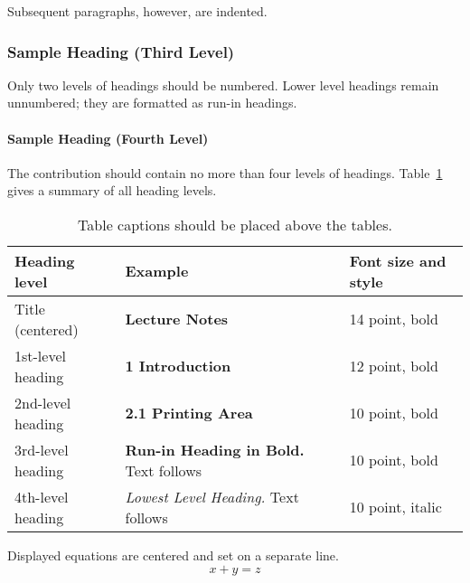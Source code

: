 \documentclass[runningheads]{llncs}
\begin{document}
Subsequent paragraphs, however, are indented.

\subsubsection{Sample Heading (Third Level)} Only two levels of
headings should be numbered. Lower level headings remain unnumbered;
they are formatted as run-in headings.

\paragraph{Sample Heading (Fourth Level)}
The contribution should contain no more than four levels of
headings. Table~\ref{tab1} gives a summary of all heading levels.

\begin{table}
\caption{Table captions should be placed above the
tables.}\label{tab1}
\begin{tabular}{|l|l|l|}
\hline
Heading level &  Example & Font size and style\\
\hline
Title (centered) &  {\Large\bfseries Lecture Notes} & 14 point, bold\\
1st-level heading &  {\large\bfseries 1 Introduction} & 12 point, bold\\
2nd-level heading & {\bfseries 2.1 Printing Area} & 10 point, bold\\
3rd-level heading & {\bfseries Run-in Heading in Bold.} Text follows & 10 point, bold\\
4th-level heading & {\itshape Lowest Level Heading.} Text follows & 10 point, italic\\
\hline
\end{tabular}
\end{table}


\noindent Displayed equations are centered and set on a separate
line.
\begin{equation}
x + y = z
\end{equation}
\end{document}
